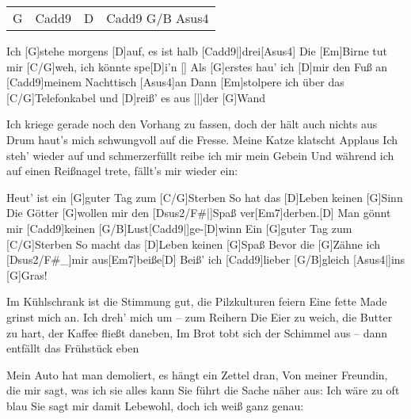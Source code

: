 

\vspace{-0.5em}


\vspace{-1em}
\begin{guitar}
	{\footnotesize\begin{tabular}{|l|l|l|l|}
			G & Cadd9 & D & Cadd9 G/B Asus4 
	\end{tabular}}

	Ich [G]stehe morgens [D]auf, es ist halb [Cadd9|]{drei}[Asus4]{}
	Die [Em]Birne tut mir [C/G]weh, ich könnte spe[D]i'n []{}
	Als [G]erstes hau' ich [D]mir den Fuß an [Cadd9]meinem Nachttisch [Asus4]an
	Dann [Em]stolpere ich über das [C/G]Telefonkabel und [D]reiß' es aus [|]{der} [G]Wand
	
	Ich kriege gerade noch den Vorhang zu fassen, doch der hält auch nichts aus
	Drum haut's mich schwungvoll auf die Fresse. Meine Katze klatscht Applaus
	Ich steh' wieder auf und schmerzerfüllt reibe ich mir mein Gebein
	Und während ich auf einen Reißnagel trete, fällt's mir wieder ein:
	
	Heut' ist ein [G]guter Tag zum [C/G]Sterben
	So hat das [D]Leben keinen [G]Sinn
	Die Götter [G]wollen mir den [Dsus2/F#|]{Spaß} ver[Em7]derben.[D]{}
	Man gönnt mir [Cadd9]keinen [G/B]Lust[Cadd9|]{ge-}[D]winn
	Ein [G]guter Tag zum [C/G]Sterben
	So macht das [D]Leben keinen [G]Spaß
	Bevor die [G]Zähne ich [Dsus2/F#_]{mir aus}[Em7]beiße[D]{}
	Beiß' ich [Cadd9]lieber [G/B]gleich [Asus4|]{ins} [G]Gras!
	
	Im Kühlschrank ist die Stimmung gut, die Pilzkulturen feiern
	Eine fette Made grinst mich an. Ich dreh' mich um – zum Reihern
	Die Eier zu weich, die Butter zu hart, der Kaffee fließt daneben,
	Im Brot tobt sich der Schimmel aus – dann entfällt das Frühstück eben
	
	Mein Auto hat man demoliert, es hängt ein Zettel dran,
	Von meiner Freundin, die mir sagt, was ich sie alles kann
	Sie führt die Sache näher aus: Ich wäre zu oft blau
	Sie sagt mir damit Lebewohl, doch ich weiß ganz genau:
	

\end{guitar}
